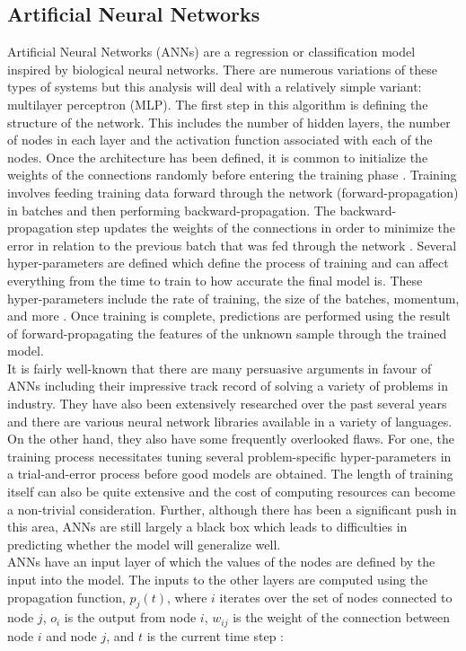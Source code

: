 \documentclass[titlepage]{article}
\begin{document}
\subsection{Artificial Neural Networks}
Artificial Neural Networks (ANNs) are a regression or classification model inspired by biological neural networks. There are numerous variations of these types of systems but this analysis will deal with a relatively simple variant: multilayer perceptron (MLP). The first step in this algorithm is defining the structure of the network. This includes the number of hidden layers, the number of nodes in each layer and the activation function associated with each of the nodes. Once the architecture has been defined, it is common to initialize the weights of the connections randomly before entering the training phase \cite{AnnInit}. Training involves feeding training data forward through the network (forward-propagation) in batches and then performing backward-propagation. The backward-propagation step updates the weights of the connections in order to minimize the error in relation to the previous batch that was fed through the network \cite{AnnSpec}. Several hyper-parameters are defined which define the process of training and can affect everything from the time to train to how accurate the final model is. These hyper-parameters include the rate of training, the size of the batches, momentum, and more \cite{AnnSpec}. Once training is complete, predictions are performed using the result of forward-propagating the features of the unknown sample through the trained model.\\
It is fairly well-known that there are many persuasive arguments in favour of ANNs including their impressive track record of solving a variety of problems in industry. They have also been extensively researched over the past several years and there are various neural network libraries available in a variety of languages. On the other hand, they also have some frequently overlooked flaws. For one, the training process necessitates tuning several problem-specific hyper-parameters in a trial-and-error process before good models are obtained. The length of training itself can also be quite extensive and the cost of computing resources can become a non-trivial consideration. Further, although there has been a significant push in this area, ANNs are still largely a black box which leads to difficulties in predicting whether the model will generalize well.\\
ANNs have an input layer of which the values of the nodes are defined by the input into the model. The inputs to the other layers are computed using the propagation function, $p_j(t)$, where $i$ iterates over the set of nodes connected to node $j$, $o_i$ is the output from node $i$, $w_{ij}$ is the weight of the connection between node $i$ and node $j$, and $t$ is the current time step \cite{AnnMath}:
\end{document}
